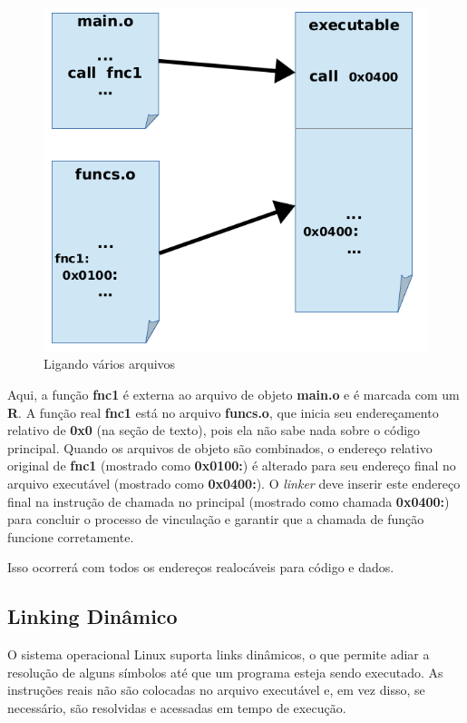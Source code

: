 \begin{figure}[h]
    \includegraphics[width=\linewidth]{imagens/linker}
	\caption{Ligando vários arquivos}
	\label{fig:linker}
\end{figure}

Aqui, a função \textbf{fnc1} é externa ao arquivo de objeto \textbf{main.o} e é marcada com um \textbf{R}. A função real \textbf{fnc1} está no arquivo \textbf{funcs.o}, que inicia seu endereçamento relativo de \textbf{0x0} (na seção de texto), pois ela não sabe nada sobre o código principal. Quando os arquivos de objeto são combinados, o endereço relativo original de \textbf{fnc1} (mostrado como \textbf{0x0100:}) é alterado para seu endereço final no arquivo executável (mostrado como \textbf{0x0400:}). O \textit{linker} deve inserir este endereço final na instrução de chamada no principal (mostrado como chamada \textbf{0x0400:}) para concluir o processo de vinculação e garantir que a chamada de função funcione corretamente.

Isso ocorrerá com todos os endereços realocáveis para código e dados.

\subsection{Linking Dinâmico}
O sistema operacional Linux suporta links dinâmicos, o que permite adiar a resolução de alguns símbolos até que um programa esteja sendo executado. As instruções reais não são colocadas no arquivo executável e, em vez disso, se necessário, são resolvidas e acessadas em tempo de execução.

